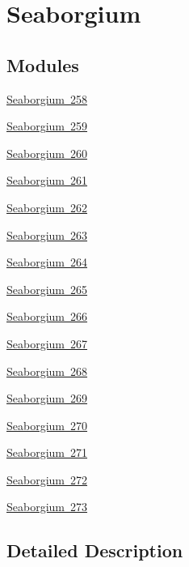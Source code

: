 \hypertarget{group___isotope_const-_seaborgium}{}\section{Seaborgium}
\label{group___isotope_const-_seaborgium}
\subsection*{Modules}
\begin{DoxyCompactItemize}
\item 
\mbox{\hyperlink{group___isotope_const-_seaborgium-_sg258}{Seaborgium 258}}
\item 
\mbox{\hyperlink{group___isotope_const-_seaborgium-_sg259}{Seaborgium 259}}
\item 
\mbox{\hyperlink{group___isotope_const-_seaborgium-_sg260}{Seaborgium 260}}
\item 
\mbox{\hyperlink{group___isotope_const-_seaborgium-_sg261}{Seaborgium 261}}
\item 
\mbox{\hyperlink{group___isotope_const-_seaborgium-_sg262}{Seaborgium 262}}
\item 
\mbox{\hyperlink{group___isotope_const-_seaborgium-_sg263}{Seaborgium 263}}
\item 
\mbox{\hyperlink{group___isotope_const-_seaborgium-_sg264}{Seaborgium 264}}
\item 
\mbox{\hyperlink{group___isotope_const-_seaborgium-_sg265}{Seaborgium 265}}
\item 
\mbox{\hyperlink{group___isotope_const-_seaborgium-_sg266}{Seaborgium 266}}
\item 
\mbox{\hyperlink{group___isotope_const-_seaborgium-_sg267}{Seaborgium 267}}
\item 
\mbox{\hyperlink{group___isotope_const-_seaborgium-_sg268}{Seaborgium 268}}
\item 
\mbox{\hyperlink{group___isotope_const-_seaborgium-_sg269}{Seaborgium 269}}
\item 
\mbox{\hyperlink{group___isotope_const-_seaborgium-_sg270}{Seaborgium 270}}
\item 
\mbox{\hyperlink{group___isotope_const-_seaborgium-_sg271}{Seaborgium 271}}
\item 
\mbox{\hyperlink{group___isotope_const-_seaborgium-_sg272}{Seaborgium 272}}
\item 
\mbox{\hyperlink{group___isotope_const-_seaborgium-_sg273}{Seaborgium 273}}
\end{DoxyCompactItemize}


\subsection{Detailed Description}
